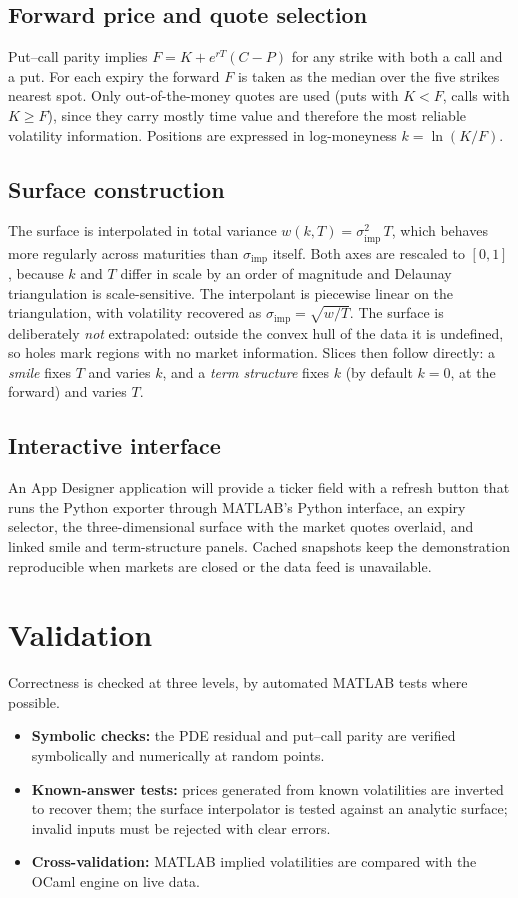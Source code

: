 \documentclass[11pt]{article}
\newcommand{\IV}{\sigma_{\mathrm{imp}}}
\begin{document}
\subsection{Forward price and quote selection}
Put--call parity implies $F = K + e^{rT}(C - P)$ for any strike with both a call and a put. For each expiry the forward $F$ is taken as the median over the five strikes nearest spot. Only out-of-the-money quotes are used (puts with $K<F$, calls with $K\ge F$), since they carry mostly time value and therefore the most reliable volatility information. Positions are expressed in log-moneyness $k = \ln(K/F)$.

\subsection{Surface construction}
The surface is interpolated in total variance $w(k,T) = \IV^2\,T$, which behaves more regularly across maturities than $\IV$ itself. Both axes are rescaled to $[0,1]$, because $k$ and $T$ differ in scale by an order of magnitude and Delaunay triangulation is scale-sensitive. The interpolant is piecewise linear on the triangulation, with volatility recovered as $\IV = \sqrt{w/T}$. The surface is deliberately \emph{not} extrapolated: outside the convex hull of the data it is undefined, so holes mark regions with no market information. Slices then follow directly: a \emph{smile} fixes $T$ and varies $k$, and a \emph{term structure} fixes $k$ (by default $k=0$, at the forward) and varies $T$.

\subsection{Interactive interface}
An App Designer application will provide a ticker field with a refresh button that runs the Python exporter through MATLAB's Python interface, an expiry selector, the three-dimensional surface with the market quotes overlaid, and linked smile and term-structure panels. Cached snapshots keep the demonstration reproducible when markets are closed or the data feed is unavailable.

\section{Validation}
Correctness is checked at three levels, by automated MATLAB tests where possible.
\begin{itemize}
  \item \textbf{Symbolic checks:} the PDE residual and put--call parity are verified symbolically and numerically at random points.
  \item \textbf{Known-answer tests:} prices generated from known volatilities are inverted to recover them; the surface interpolator is tested against an analytic surface; invalid inputs must be rejected with clear errors.
  \item \textbf{Cross-validation:} MATLAB implied volatilities are compared with the OCaml engine on live data.
\end{itemize}
\end{document}
